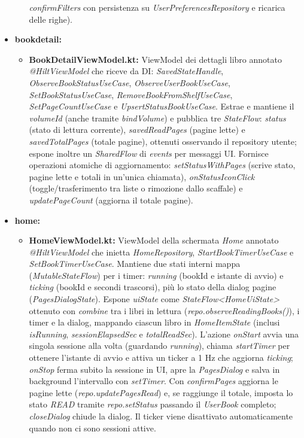 \documentclass{article}
\begin{document}
\begin{itemize}
\begin{itemize}
    \textit{confirmFilters} con persistenza su \textit{UserPreferencesRepository} e ricarica delle righe).
  \end{itemize}
  \item \textbf{bookdetail:}
  \begin{itemize}
    \item \textbf{BookDetailViewModel.kt:} ViewModel dei dettagli libro annotato \textit{@HiltViewModel} che riceve da DI: \textit{SavedStateHandle}, \textit{ObserveBookStatusUseCase}, \textit{ObserveUserBookUseCase}, \textit{SetBookStatusUseCase}, \textit{RemoveBookFromShelfUseCase}, 
    \textit{SetPageCountUseCase} e \textit{UpsertStatusBookUseCase}. Estrae e mantiene il \textit{volumeId} (anche tramite \textit{bindVolume}) e pubblica tre \textit{StateFlow}: \textit{status} (stato di lettura corrente), \textit{savedReadPages} (pagine lette) e \textit{savedTotalPages} (totale pagine), 
    ottenuti osservando il repository utente; espone inoltre un \textit{SharedFlow} di \textit{events} per messaggi UI. Fornisce operazioni atomiche di aggiornamento: \textit{setStatusWithPages} (scrive stato, pagine lette e totali in un’unica chiamata), \textit{onStatusIconClick} (toggle/trasferimento tra liste o rimozione dallo scaffale) e \textit{updatePageCount} (aggiorna il totale pagine).
  \end{itemize}
  \item \textbf{home:}
  \begin{itemize}
    \item \textbf{HomeViewModel.kt:} ViewModel della schermata \emph{Home} annotato \textit{@HiltViewModel} che inietta \textit{HomeRepository}, \textit{StartBookTimerUseCase} e \textit{SetBookTimerUseCase}. Mantiene due stati interni mappa (\textit{MutableStateFlow}) per i timer: \emph{running} (bookId e istante di avvio) e \emph{ticking} (bookId e secondi trascorsi), più lo stato della dialog pagine (\textit{PagesDialogState}). 
    Espone \textit{uiState} come \textit{StateFlow\textless HomeUiState\textgreater} ottenuto con \textit{combine} tra i libri in lettura (\textit{repo.observeReadingBooks()}), i timer e la dialog, mappando ciascun libro in \textit{HomeItemState} (inclusi \emph{isRunning}, \emph{sessionElapsedSec} e \emph{totalReadSec}). L’azione \emph{onStart} avvia una singola sessione alla volta (guardando \emph{running}), chiama \textit{startTimer} 
    per ottenere l’istante di avvio e attiva un ticker a 1 Hz che aggiorna \emph{ticking}; \emph{onStop} ferma subito la sessione in UI, apre la \emph{PagesDialog} e salva in background l’intervallo con \textit{setTimer}. Con \emph{confirmPages} aggiorna le pagine lette (\textit{repo.updatePagesRead}) e, se raggiunge il totale, imposta lo stato \textit{READ} tramite \textit{repo.setStatus} passando il \textit{UserBook} completo; \emph{closeDialog} chiude la dialog. Il ticker viene disattivato automaticamente quando non ci sono sessioni attive.

\end{itemize}
\end{itemize}
\end{document}
